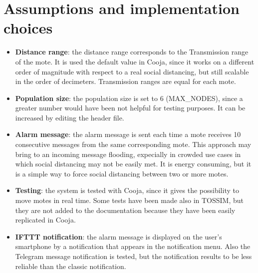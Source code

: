 \documentclass[11pt]{article}
\begin{document}
\section{Assumptions and implementation choices}
\begin{itemize}
    \item \textbf{Distance range}: the distance range corresponds to the Transmission range of the mote. It is used the default value in Cooja, since it works on a different order of magnitude with respect to a real social distancing, but still scalable in the order of decimeters. Transmission ranges are equal for each mote.
    \item \textbf{Population size}: the population size is set to 6 (MAX\_NODES), since a greater number would have been not helpful for testing purposes. It can be increased by editing the header file. 
    \item \textbf{Alarm message}: the alarm message is sent each time a mote receives 10 consecutive messages from the same corresponding mote. This approach may bring to an incoming message flooding, expecially in crowded use cases in which social distancing may not be easily met. It is energy consuming, but it is a simple way to force social distancing between two or more motes.
    \item \textbf{Testing}: the system is tested with Cooja, since it gives the possibility to move motes in real time. Some tests have been made also in TOSSIM, but they are not added to the documentation because they have been easily replicated in Cooja.
    \item \textbf{IFTTT notification}: the alarm message is displayed on the user's smartphone by a notification that appears in the notification menu. Also the Telegram message notification is tested, but the notification results to be less reliable than the classic notification.
\end{itemize}
\end{document}
